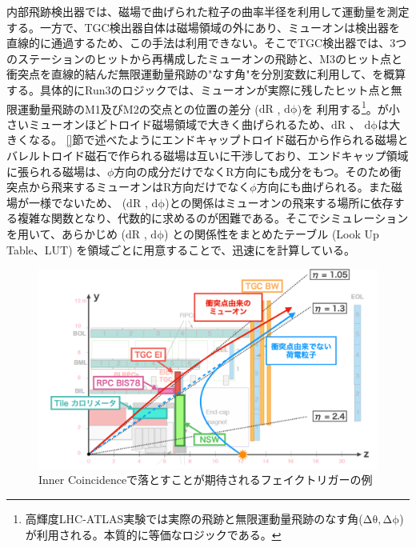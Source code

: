 内部飛跡検出器では、磁場で曲げられた粒子の曲率半径を利用して運動量を測定する。一方で、TGC検出器自体は磁場領域の外にあり、ミューオンは検出器を直線的に通過するため、この手法は利用できない。そこでTGC検出器では、3つのステーションのヒットから再構成したミューオンの飛跡と、M3のヒット点と衝突点を直線的結んだ無限運動量飛跡の"なす角"を分別変数に利用して、\pt を概算する。具体的にRun3のロジックでは、ミューオンが実際に残したヒット点と無限運動量飛跡のM1及びM2の交点との位置の差分  ($\mathrm{dR}$ , $\mathrm{d\phi}$)を 利用する\footnote{高輝度LHC-ATLAS実験では実際の飛跡と無限運動量飛跡のなす角($\mathrm{\Delta\theta, \Delta\phi}$)が利用される。本質的に等価なロジックである。}。\pt が小さいミューオンほどトロイド磁場領域で大きく曲げられるため、$\mathrm{dR}$ 、 $\mathrm{d\phi}$は大きくなる。
\ref{}節で述べたようにエンドキャップトロイド磁石から作られる磁場とバレルトロイド磁石で作られる磁場は互いに干渉しており、エンドキャップ領域に張られる磁場は、$\phi$方向の成分だけでなくR方向にも成分をもつ。そのため衝突点から飛来するミューオンはR方向だけでなく$\phi$方向にも曲げられる。また磁場が一様でないため、 ($\mathrm{dR}$ , $\mathrm{d\phi}$)と\pt の関係はミューオンの飛来する場所に依存する複雑な関数となり、代数的に求めるのが困難である。そこでシミュレーションを用いて、あらかじめ  ($\mathrm{dR}$ , $\mathrm{d\phi}$) と\pt の関係性をまとめたテーブル  (Look Up Table、LUT) を領域ごとに用意することで、迅速に\pt を計算している。

\begin{figure} 
\centering
\includegraphics[width=16cm]{fig/Intro/TGC_Inner_concept.png}
\caption[フェイクトリガーの例]{Inner Coincidenceで落とすことが期待されるフェイクトリガーの例\cite{mt_kawamoto}}

\label{TGC_Inner_concept}
\end{figure}

